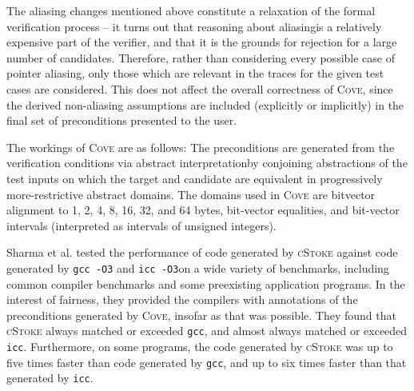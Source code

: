 \documentclass[12pt,twoside]{reedthesis}
\begin{document}
        The aliasing changes mentioned above constitute a relaxation of the formal verification process -- it turns out that reasoning about aliasing\footnotemark is a relatively expensive part of the verifier, and that it is the grounds for rejection for a large number of candidates.
        Therefore, rather than considering every possible case of pointer aliasing, only those which are relevant in the traces for the given test cases are considered.
        This does not affect the overall correctness of \textsc{Cove}, since the derived non-aliasing assumptions are included (explicitly or implicitly) in the final set of preconditions presented to the user.
        
        
        The workings of \textsc{Cove} are as follows:
        The preconditions are generated from the verification conditions via abstract interpretation\footnotemark by conjoining abstractions of the test inputs on which the target and candidate are equivalent in progressively more-restrictive abstract domains.
        The domains used in \textsc{Cove} are bitvector alignment to 1, 2, 4, 8, 16, 32, and 64 bytes, bit-vector equalities, and bit-vector intervals (interpreted as intervals of unsigned integers).
        
        
        
        Sharma et al. tested the performance of code generated by \textsc{cStoke} against code generated by \texttt{gcc -O3} and \texttt{icc -O3}\footnotemark on a wide variety of benchmarks, including common compiler benchmarks and some preexisting application programs.
        In the interest of fairness, they provided the compilers with annotations of the preconditions generated by \textsc{Cove}, insofar as that was possible.
        They found that \textsc{cStoke} always matched or exceeded \texttt{gcc}, and almost always matched or exceeded \texttt{icc}.
        Furthermore, on some programs, the code generated by \textsc{cStoke} was up to five times faster than code generated by \texttt{gcc}, and up to six times faster than that generated by \texttt{icc}.
        
\end{document}
